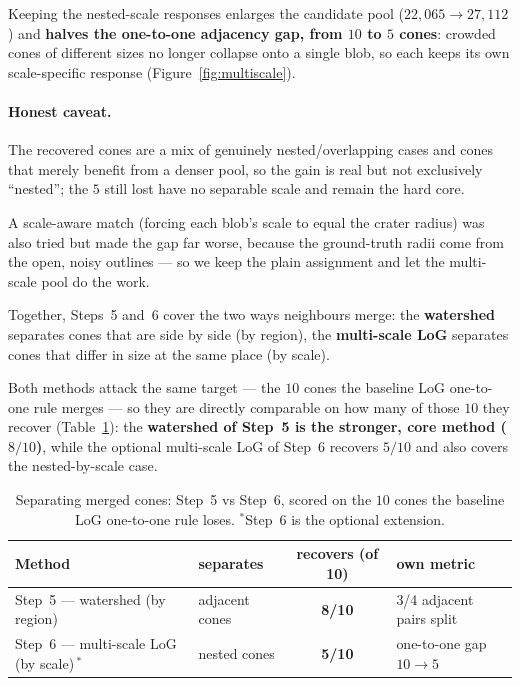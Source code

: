 \documentclass[11pt]{article}
\begin{document}
Keeping the nested-scale responses enlarges the candidate pool ($22{,}065\to27{,}112$) and
\textbf{halves the one-to-one adjacency gap, from $10$ to $5$ cones}: crowded cones of different
sizes no longer collapse onto a single blob, so each keeps its own scale-specific response
(Figure~\ref{fig:multiscale}).

\paragraph{Honest caveat.} The recovered cones are a mix of genuinely nested/overlapping cases and
cones that merely benefit from a denser pool, so the gain is real but not exclusively
``nested''; the $5$ still lost have no separable scale and remain the hard core.

A scale-aware match (forcing each blob's scale to equal the crater radius) was also tried but made
the gap far worse, because the ground-truth radii come from the open, noisy outlines --- so we keep
the plain assignment and let the multi-scale pool do the work.

Together, Steps~5 and~6 cover the two ways neighbours merge: the \textbf{watershed} separates cones
that are side by side (by region), the \textbf{multi-scale LoG} separates cones that differ in size
at the same place (by scale).

Both methods attack the same target --- the $10$ cones the baseline LoG one-to-one rule merges ---
so they are directly comparable on how many of those $10$ they recover (Table~\ref{tab:sep}): the
\textbf{watershed of Step~5 is the stronger, core method ($8/10$)}, while the optional multi-scale
LoG of Step~6 recovers $5/10$ and also covers the nested-by-scale case.

\begin{table}[h]
\centering
\begin{tabular}{l l c l}
\hline
Method & separates & recovers (of 10) & own metric\\
\hline
Step~5 --- watershed (by region) & adjacent cones & \textbf{8/10} & 3/4 adjacent pairs split\\
Step~6 --- multi-scale LoG (by scale)\,$^\ast$ & nested cones & \textbf{5/10} & one-to-one gap $10\!\to\!5$\\
\hline
\end{tabular}
\caption{Separating merged cones: Step~5 vs Step~6, scored on the $10$ cones the baseline LoG
one-to-one rule loses. $^\ast$Step~6 is the optional extension.}
\label{tab:sep}
\end{table}
\end{document}
